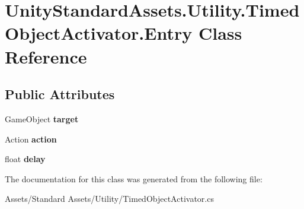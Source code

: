 \hypertarget{class_unity_standard_assets_1_1_utility_1_1_timed_object_activator_1_1_entry}{}\section{Unity\+Standard\+Assets.\+Utility.\+Timed\+Object\+Activator.\+Entry Class Reference}
\label{class_unity_standard_assets_1_1_utility_1_1_timed_object_activator_1_1_entry}
\subsection*{Public Attributes}
\begin{DoxyCompactItemize}
\item 
Game\+Object {\bfseries target}\hypertarget{class_unity_standard_assets_1_1_utility_1_1_timed_object_activator_1_1_entry_a3e9d41eb28d6b3d02c23f535acdcd42b}{}\label{class_unity_standard_assets_1_1_utility_1_1_timed_object_activator_1_1_entry_a3e9d41eb28d6b3d02c23f535acdcd42b}

\item 
Action {\bfseries action}\hypertarget{class_unity_standard_assets_1_1_utility_1_1_timed_object_activator_1_1_entry_a84fbb4ec57c08061063377bd6df0270d}{}\label{class_unity_standard_assets_1_1_utility_1_1_timed_object_activator_1_1_entry_a84fbb4ec57c08061063377bd6df0270d}

\item 
float {\bfseries delay}\hypertarget{class_unity_standard_assets_1_1_utility_1_1_timed_object_activator_1_1_entry_a7b892e6433f3ab2fe212b171b57e9a75}{}\label{class_unity_standard_assets_1_1_utility_1_1_timed_object_activator_1_1_entry_a7b892e6433f3ab2fe212b171b57e9a75}

\end{DoxyCompactItemize}


The documentation for this class was generated from the following file\+:\begin{DoxyCompactItemize}
\item 
Assets/\+Standard Assets/\+Utility/Timed\+Object\+Activator.\+cs\end{DoxyCompactItemize}
